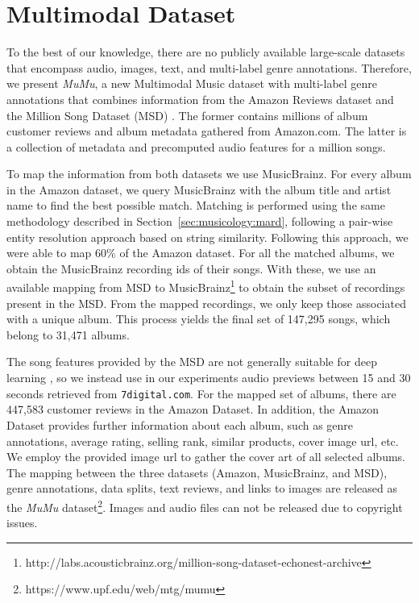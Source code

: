 \section{Multimodal Dataset}\label{sec:multi-class:mumu}

To the best of our knowledge, there are no publicly available large-scale datasets that encompass audio, images, text, and multi-label genre annotations. %
Therefore, we present \emph{MuMu}, a new Multimodal Music dataset with multi-label genre annotations that combines information from the Amazon Reviews dataset \citep{mcauley2015image} and the Million Song Dataset (MSD) \citep{Bertin-Mahieux2011}. 
The former contains millions of album customer reviews and album metadata gathered from Amazon.com. 
The latter is a collection of metadata and precomputed audio features for a million songs. 

To map the information from both datasets we use MusicBrainz. 
For every album in the Amazon dataset, we query MusicBrainz with the album title and artist name to find the best possible match. Matching is performed using the same methodology described in Section~\ref{sec:musicology:mard}, following a pair-wise entity resolution approach based on string similarity. Following this approach, we were able to map 60\% of the Amazon dataset.
For all the matched albums, we obtain the MusicBrainz recording ids of their songs. 
With these, we use an available mapping from MSD to MusicBrainz\footnote{http://labs.acousticbrainz.org/million-song-dataset-echonest-archive} to obtain the subset of recordings present in the MSD. 
From the mapped recordings, we only keep those associated with a unique album.
This process yields the final set of 147,295 songs, which belong to 31,471 albums.

The song features provided by the MSD are not generally suitable for deep learning \citep{Oord2013}, so we instead use in our experiments audio previews between 15 and 30 seconds retrieved from \texttt{7digital.com}.
For the mapped set of albums, there are 447,583 customer reviews in the Amazon Dataset. 
In addition, the Amazon Dataset provides further information about each album, such as genre annotations, average rating, selling rank, similar products, cover image url, etc. 
We employ the provided image url to gather the cover art of all selected albums. 
The mapping between the three datasets (Amazon, MusicBrainz, and MSD), genre annotations, data splits, text reviews, and links to images are released as the \emph{MuMu} dataset\footnote{https://www.upf.edu/web/mtg/mumu}. Images and audio files can not be released due to copyright issues.

